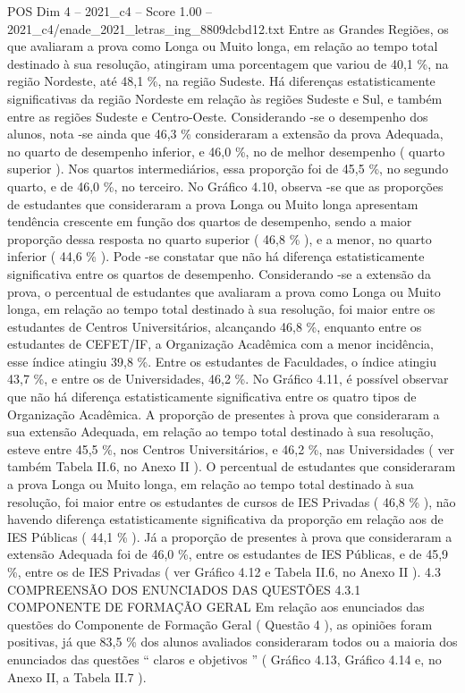 \begin{textsample}{POS Dim 4 – 2021\_c4 – Score 1.00 – 2021\_c4/enade\_2021\_letras\_ing\_8809dcbd12.txt}
Entre as Grandes Regiões, os que avaliaram a prova como Longa ou Muito longa, em relação ao tempo total destinado à sua resolução, atingiram uma porcentagem que variou de 40,1 \%, na região Nordeste, até 48,1 \%, na região Sudeste.
Há diferenças estatisticamente significativas da região Nordeste em relação às regiões Sudeste e Sul, e também entre as regiões Sudeste e Centro-Oeste.
Considerando -se o desempenho dos alunos, nota -se ainda que 46,3 \% consideraram a extensão da prova Adequada, no quarto de desempenho inferior, e 46,0 \%, no de melhor desempenho ( quarto superior ).
Nos quartos intermediários, essa proporção foi de 45,5 \%, no segundo quarto, e de 46,0 \%, no terceiro.
No Gráfico 4.10, observa -se que as proporções de estudantes que consideraram a prova Longa ou Muito longa apresentam tendência crescente em função dos quartos de desempenho, sendo a maior proporção dessa resposta no quarto superior ( 46,8 \% ), e a menor, no quarto inferior ( 44,6 \% ).
Pode -se constatar que não há diferença estatisticamente significativa entre os quartos de desempenho.
Considerando -se a extensão da prova, o percentual de estudantes que avaliaram a prova como Longa ou Muito longa, em relação ao tempo total destinado à sua resolução, foi maior entre os estudantes de Centros Universitários, alcançando 46,8 \%, enquanto entre os estudantes de CEFET/IF, a Organização Acadêmica com a menor incidência, esse índice atingiu 39,8 \%.
Entre os estudantes de Faculdades, o índice atingiu 43,7 \%, e entre os de Universidades, 46,2 \%.
No Gráfico 4.11, é possível observar que não há diferença estatisticamente significativa entre os quatro tipos de Organização Acadêmica.
A proporção de presentes à prova que consideraram a sua extensão Adequada, em relação ao tempo total destinado à sua resolução, esteve entre 45,5 \%, nos Centros Universitários, e 46,2 \%, nas Universidades ( ver também Tabela II.6, no Anexo II ).
O percentual de estudantes que consideraram a prova Longa ou Muito longa, em relação ao tempo total destinado à sua resolução, foi maior entre os estudantes de cursos de IES Privadas ( 46,8 \% ), não havendo diferença estatisticamente significativa da proporção em relação aos de IES Públicas ( 44,1 \% ).
Já a proporção de presentes à prova que consideraram a extensão Adequada foi de 46,0 \%, entre os estudantes de IES Públicas, e de 45,9 \%, entre os de IES Privadas ( ver Gráfico 4.12 e Tabela II.6, no Anexo II ). 4.3 COMPREENSÃO DOS ENUNCIADOS DAS QUESTÕES 4.3.1 COMPONENTE DE FORMAÇÃO GERAL Em relação aos enunciados das questões do Componente de Formação Geral ( Questão 4 ), as opiniões foram positivas, já que 83,5 \% dos alunos avaliados consideraram todos ou a maioria dos enunciados das questões “ claros e objetivos ” ( Gráfico 4.13, Gráfico 4.14 e, no Anexo II, a Tabela II.7 ).

\end{textsample}
